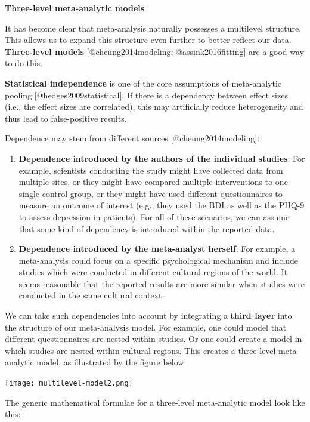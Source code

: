 \documentclass[]{book}
\providecommand{\tightlist}{%
  \setlength{\itemsep}{0pt}\setlength{\parskip}{0pt}}
\begin{document}
\begin{rmdinfo}
\textbf{Three-level meta-analytic models}

It has become clear that meta-analysis naturally possesses a multilevel
structure. This allows us to expand this structure even further to
better reflect our data. \textbf{Three-level models}
{[}@cheung2014modeling; @assink2016fitting{]} are a good way to do this.

\textbf{Statistical independence} is one of the core assumptions of
meta-analytic pooling {[}@hedges2009statistical{]}. If there is a
dependency between effect sizes (i.e., the effect sizes are correlated),
this may artificially reduce heterogeneity and thus lead to
false-positive results.

Dependence may stem from different sources {[}@cheung2014modeling{]}:

\begin{enumerate}
.{enumi{enumi}.}
\tightlist
\item
  \textbf{Dependence introduced by the authors of the individual
  studies}. For example, scientists conducting the study might have
  collected data from multiple sites, or they might have compared
  \protect\hyperlink{i}{multiple interventions to one single control
  group}, or they might have used different questionnaires to measure an
  outcome of interest (e.g., they used the BDI as well as the PHQ-9 to
  assess depression in patients). For all of these scenarios, we can
  assume that some kind of dependency is introduced within the reported
  data.
\item
  \textbf{Dependence introduced by the meta-analyst herself}. For
  example, a meta-analysis could focus on a specific psychological
  mechanism and include studies which were conducted in different
  cultural regions of the world. It seems reasonable that the reported
  results are more similar when studies were conducted in the same
  cultural context.
\end{enumerate}

We can take such dependencies into account by integrating a
\textbf{third layer} into the structure of our meta-analysis model. For
example, one could model that different questionnaires are nested within
studies. Or one could create a model in which studies are nested within
cultural regions. This creates a three-level meta-analytic model, as
illustrated by the figure below.

\texttt{[image: multilevel-model2.png]}

The generic mathematical formulae for a three-level meta-analytic model
look like this:


\end{rmdinfo}
\end{document}
